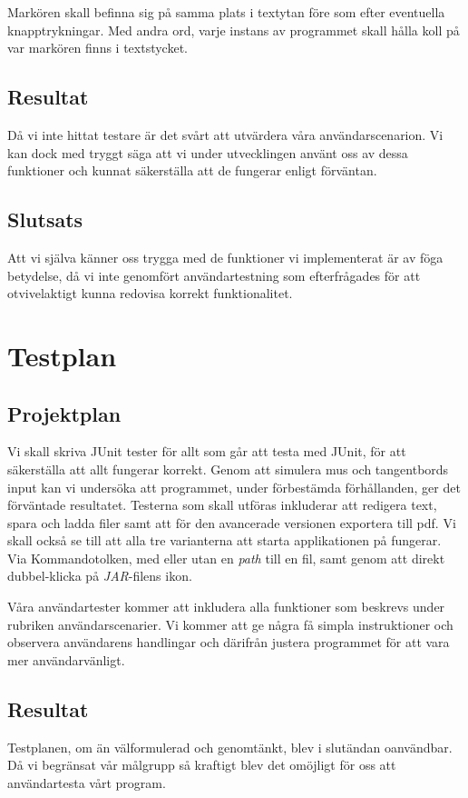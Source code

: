 \documentclass[a4paper,11p,twoside]{article}
\begin{document}
Markören skall befinna sig på samma plats i textytan före som efter eventuella knapptrykningar. Med andra ord, varje instans av programmet skall hålla koll på var markören finns i textstycket.

\subsection{Resultat}
Då vi inte hittat testare är det svårt att utvärdera våra användarscenarion. Vi kan dock med tryggt säga att vi under utvecklingen använt oss av dessa funktioner och kunnat säkerställa att de fungerar enligt förväntan.

\subsection{Slutsats}
Att vi själva känner oss trygga med de funktioner vi implementerat är av föga betydelse, då vi inte genomfört användartestning som efterfrågades för att otvivelaktigt kunna redovisa korrekt funktionalitet.

\section{Testplan}
\subsection{Projektplan}
Vi skall skriva JUnit tester för allt som går att testa med JUnit, för att säkerställa att allt fungerar korrekt. Genom att simulera mus och tangentbords input kan vi undersöka att programmet, under förbestämda förhållanden, ger det förväntade resultatet. Testerna som skall utföras inkluderar att redigera text, spara och ladda filer samt att för den avancerade versionen exportera till pdf. Vi skall också se till att alla tre varianterna att starta applikationen på fungerar. Via Kommandotolken, med eller utan en \emph{path} till en fil, samt genom att direkt dubbel-klicka på \emph{JAR}-filens ikon.

Våra användartester kommer att inkludera alla funktioner som beskrevs under rubriken användarscenarier. Vi kommer att ge några få simpla instruktioner och observera användarens handlingar och därifrån justera programmet för att vara mer användarvänligt.

\subsection{Resultat}
Testplanen, om än välformulerad och genomtänkt, blev i slutändan oanvändbar. Då vi begränsat vår målgrupp så kraftigt blev det omöjligt för oss att användartesta vårt program. 
\end{document}
